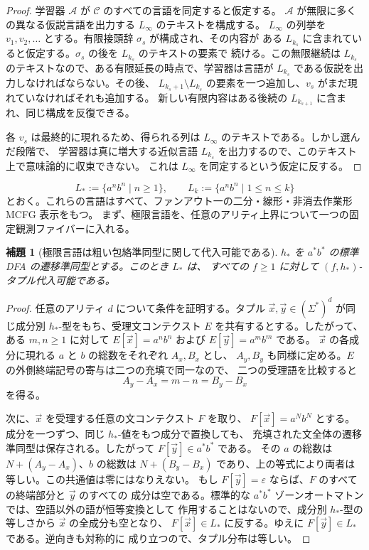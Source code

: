 \documentclass[11pt,a4paper]{ltjsarticle}
\newtheorem{lemma}[theorem]{補題}
\theoremstyle{remark}
\newcommand{\tuple}[1]{\vec{#1}}
\newcommand{\eps}{\varepsilon}
\begin{document}
\begin{proof}
学習器 \(\mathcal A\) が \(\mathcal C\) のすべての言語を同定すると仮定する。
\(\mathcal A\) が無限に多くの異なる仮説言語を出力する \(L_\infty\) のテキストを構成する。
\(L_\infty\) の列挙を \(v_1,v_2,\ldots\) とする。有限接頭辞 \(\sigma_s\) が構成され、その内容が
ある \(L_{k_s}\) に含まれていると仮定する。\(\sigma_s\) の後を \(L_{k_s}\) のテキストの要素で
続ける。この無限継続は \(L_{k_s}\) のテキストなので、ある有限延長の時点で、学習器は言語が
\(L_{k_s}\) である仮説を出力しなければならない。その後、
\(L_{k_s+1}\setminus L_{k_s}\) の要素を一つ追加し、\(v_s\) がまだ現れていなければそれも追加する。
新しい有限内容はある後続の \(L_{k_{s+1}}\) に含まれ、同じ構成を反復できる。

各 \(v_s\) は最終的に現れるため、得られる列は \(L_\infty\) のテキストである。しかし選んだ段階で、
学習器は真に増大する近似言語 \(L_{k_s}\) を出力するので、このテキスト上で意味論的に収束できない。
これは \(L_\infty\) を同定するという仮定に反する。
\end{proof}

\[
  L_*:=\{a^n b^n\mid n\ge1\},
  \qquad
  L_k:=\{a^n b^n\mid 1\le n\le k\}
\]
とおく。これらの言語はすべて、ファンアウト一の二分・線形・非消去作業形 MCFG 表示をもつ。
まず、極限言語を、任意のアリティ上界について一つの固定観測ファイバーに入れる。

\begin{lemma}[極限言語は粗い包絡準同型に関して代入可能である]
\label{lem:limit-ab-substitutable}
\(h_*\) を \(a^*b^*\) の標準 DFA の遷移準同型とする。このとき \(L_*\) は、
すべての \(f\ge1\) に対して \((f,h_*)\)-タプル代入可能である。
\end{lemma}

\begin{proof}
任意のアリティ \(d\) について条件を証明する。タプル
\(\tuple x,\tuple y\in(\Sigma^*)^d\) が同じ成分別 \(h_*\)-型をもち、受理文コンテクスト
\(E\) を共有するとする。したがって、ある \(m,n\ge1\) に対して
\(E[\tuple x]=a^n b^n\) および \(E[\tuple y]=a^m b^m\) である。
\(\tuple x\) の各成分に現れる \(a\) と \(b\) の総数をそれぞれ \(A_x,B_x\) とし、
\(A_y,B_y\) も同様に定める。\(E\) の外側終端記号の寄与は二つの充填で同一なので、
二つの受理語を比較すると
\[
  A_y-A_x=m-n=B_y-B_x
\]
を得る。

次に、\(\tuple x\) を受理する任意の文コンテクスト \(F\) を取り、
\(F[\tuple x]=a^N b^N\) とする。成分を一つずつ、同じ \(h_*\)-値をもつ成分で置換しても、
充填された文全体の遷移準同型は保存される。したがって \(F[\tuple y]\in a^*b^*\) である。
その \(a\) の総数は \(N+(A_y-A_x)\)、\(b\) の総数は
\(N+(B_y-B_x)\) であり、上の等式により両者は等しい。この共通値は零にはなりえない。
もし \(F[\tuple y]=\eps\) ならば、\(F\) のすべての終端部分と \(\tuple y\) のすべての
成分は空である。標準的な \(a^*b^*\) ゾーンオートマトンでは、空語以外の語が恒等変換として
作用することはないので、成分別 \(h_*\)-型の等しさから \(\tuple x\) の全成分も空となり、
\(F[\tuple x]\in L_*\) に反する。ゆえに \(F[\tuple y]\in L_*\) である。逆向きも対称的に
成り立つので、タプル分布は等しい。
\end{proof}
\end{document}
